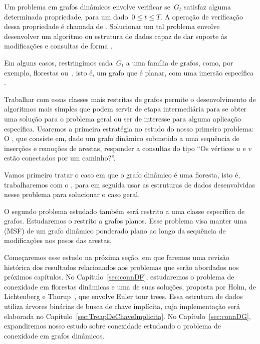 Um problema em grafos dinâmicos envolve verificar se~$G_t$ satisfaz alguma determinada propriedade, para um dado~$0\leq t\leq T$.
A operação de verificação dessa propriedade é chamada de .
Solucionar um tal problema envolve desenvolver um algoritmo ou estrutura de dados capaz de dar suporte às modificações e consultas de forma .

Em alguns casos, restringimos cada~$G_t$ a uma família de grafos, como, por exemplo, florestas ou~, isto é, um grafo que é planar, com uma imersão específica .

Trabalhar com essas classes mais restritas de grafos permite o desenvolvimento de algoritmos mais simples que podem servir de etapa intermediária para se obter uma solução para o problema geral ou ser de interesse para alguma aplicação específica.
Usaremos a primeira estratégia no estudo do nosso primeiro problema:
O , que consiste em, dado um grafo dinâmico submetido a uma sequência de inserções e remoções de arestas, responder a consultas do tipo “Os vértices $u$ e $v$ estão conectados por um caminho?”.

Vamos primeiro tratar o caso em que o grafo dinâmico é uma floresta, isto é, trabalharemos com o ,
para em seguida usar as estruturas de dados desenvolvidas nesse problema para solucionar o caso geral.

O segundo problema estudado também será restrito a uma classe específica de grafos.
Estudaremos o  restrito a grafos planos.
Esse problema visa manter uma  (MSF) de um grafo dinâmico ponderado plano ao longo da sequência de modificações nos pesos das arestas.

Começaremos esse estudo na próxima seção, em que faremos uma revisão histórica dos resultados relacionados aos problemas que serão abordados nos próximos capítulos.
No Capítulo~\ref{sec:connDF}, estudaremos o problema de conexidade em florestas dinâmicas e uma de suas soluções, proposta por Holm, de Lichtenberg e Thorup~\cite{poly_log}, que envolve Euler tour trees.
Essa estrutura de dados utiliza árvores binárias de busca de chave implícita, cuja implementação será elaborada no Capítulo~\ref{sec:TreapDeChaveImplicita}.
No Capítulo~\ref{sec:connDG}, expandiremos nosso estudo sobre conexidade estudando o problema de conexidade em grafos dinâmicos.

